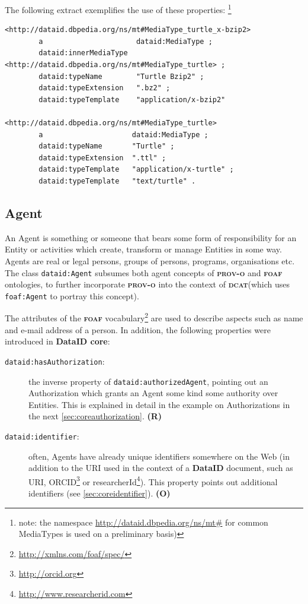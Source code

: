 \documentclass[a4paper,english,twoside,BCOR1.5cm,headsepline,DIV12,appendixprefix,final,12pt]{scrbook}
\newcommand{\dataid}{{\ttfamily\bfseries DataID}\xspace}
\newcommand{\core}{{\ttfamily\bfseries DataID core}\xspace}
\newcommand{\prov}{{\scshape\bfseries prov-o}\xspace}
\newcommand{\dcat}{{\scshape\bfseries dcat}\xspace}
\newcommand{\foaf}{{\scshape\bfseries foaf}\xspace}
\newcommand{\prop}[1]{{{\texttt{#1}}}}
\newcommand\footnoteurl[1]{\footnote{\scriptsize\url{#1}}}
\begin{document}
The following extract exemplifies the use of these properties:
\footnote{note: the namespace \url{http://dataid.dbpedia.org/ns/mt#} for common MediaTypes is used on a preliminary basis)}
\\
\begin{lstlisting}[language=ttl, captionpos=b,caption=Example of a complex media type,label=lst:coresuperset,linewidth=\columnwidth,breaklines=true]
<http://dataid.dbpedia.org/ns/mt#MediaType_turtle_x-bzip2>
        a                      dataid:MediaType ;
        dataid:innerMediaType  <http://dataid.dbpedia.org/ns/mt#MediaType_turtle> ;  
        dataid:typeName        "Turtle Bzip2" ;
        dataid:typeExtension   ".bz2" ;  
        dataid:typeTemplate    "application/x-bzip2" 

<http://dataid.dbpedia.org/ns/mt#MediaType_turtle>
        a                     dataid:MediaType ;
        dataid:typeName       "Turtle" ;
        dataid:typeExtension  ".ttl" ;
        dataid:typeTemplate   "application/x-turtle" ;   
        dataid:typeTemplate   "text/turtle" .
\end{lstlisting}

\subsection{Agent} 
\label{sec:coreagent}
An Agent is something or someone that bears some form of responsibility for an Entity or activities which create, transform or manage Entities in some way. Agents are real or legal persons, groups of persons, programs, organisations etc. The class \prop{dataid:Agent} subsumes both agent concepts of \prov and \foaf ontologies, to further incorporate \prov into the context of \dcat (which uses \prop{foaf:Agent} to portray this concept). 

The attributes of the \foaf vocabulary\footnoteurl{http://xmlns.com/foaf/spec/} are used to describe aspects such as name and e-mail address of a person. In addition, the following properties were introduced in \core:

\begin{description}
\item[\prop{dataid:hasAuthorization}:] the inverse property of \prop{dataid:authorizedAgent}, pointing out an Authorization which grants an Agent some kind some authority over Entities. This is explained in detail in the example on Authorizations in the next \cref{sec:coreauthorization}. \textbf{(R)}
\item[\prop{dataid:identifier}:] often, Agents have already unique identifiers somewhere on the Web (in addition to the URI used in the context of a \dataid document, such as URI, ORCID\footnoteurl{http://orcid.org} or researcherId\footnoteurl{http://www.researcherid.com}). This property points out additional identifiers (see \cref{sec:coreidentifier}). \textbf{(O)}
\end{description}
\end{document}
